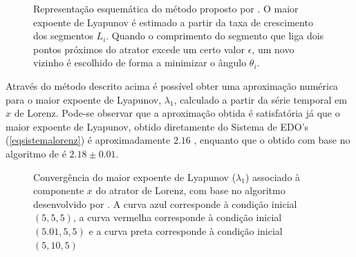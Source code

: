 \begin{figure}[ht]
\centering {}
\caption{Representação esquemática do método proposto por . O maior expoente de Lyapunov é estimado a partir da taxa de crescimento dos segmentos $L_i$. Quando o comprimento do segmento que liga dois pontos próximos do atrator excede um certo valor $\epsilon$, um novo vizinho é escolhido de forma a minimizar o ângulo $\theta_i$.}
\label{figferraralyap}
\end{figure}

Através do método descrito acima é possível obter uma aproximação numérica para o maior expoente de Lyapunov, $\lambda_1$, calculado a partir da série temporal em $x$ de Lorenz. Pode-se observar que a aproximação obtida é satisfatória já que o maior expoente de Lyapunov, obtido diretamente do Sistema de EDO's (\ref{eqsistemalorenz}) é aproximadamente $2.16$ \cite{wolf/85}, enquanto que o obtido com base no algoritmo de  é $2.18\pm0.01$.

\begin{figure}[ht]
\centering {}
\caption{Convergência do maior expoente de Lyapunov ($\lambda_1$) associado à componente $x$ do atrator de Lorenz, com base no algoritmo desenvolvido por . A curva azul corresponde à condição inicial $(5,5,5)$, a curva vermelha corresponde à condição inicial $(5.01,5,5)$ e a curva preta corresponde à condição inicial $(5,10,5)$}
\label{figlorenzlyap}
\end{figure}

